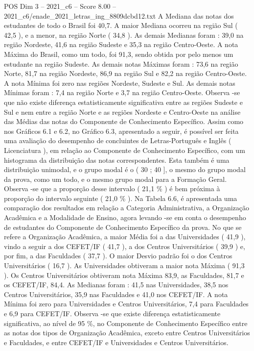 \begin{textsample}{POS Dim 3 – 2021\_c6 – Score 8.00 – 2021\_c6/enade\_2021\_letras\_ing\_8809dcbd12.txt}
A Mediana das notas dos estudantes de todo o Brasil foi 40,7.
A maior Mediana ocorreu na região Sul ( 42,5 ), e a menor, na região Norte ( 34,8 ).
As demais Medianas foram : 39,0 na região Nordeste, 41,6 na região Sudeste e 35,3 na região Centro-Oeste.
A nota Máxima do Brasil, como um todo, foi 91,3, sendo obtida por pelo menos um estudante na região Sudeste.
As demais notas Máximas foram : 73,6 na região Norte, 81,7 na região Nordeste, 86,9 na região Sul e 82,2 na região Centro-Oeste.
A nota Mínima foi zero nas regiões Nordeste, Sudeste e Sul.
As demais notas Mínimas foram : 7,4 na região Norte e 3,7 na região Centro-Oeste.
Observa -se que não existe diferença estatisticamente significativa entre as regiões Sudeste e Sul e nem entre a região Norte e as regiões Nordeste e Centro-Oeste na análise das Médias das notas do Componente de Conhecimento Específico.
Assim como nos Gráficos 6.1 e 6.2, no Gráfico 6.3, apresentado a seguir, é possível ser feita uma avaliação do desempenho de concluintes de Letras-Português e Inglês ( Licenciatura ), em relação ao Componente de Conhecimento Específico, com um histograma da distribuição das notas correspondentes.
Esta também é uma distribuição unimodal, e o grupo modal é o ( 30 ; 40 ], o mesmo do grupo modal da prova, como um todo, e o mesmo grupo modal para a Formação Geral.
Observa -se que a proporção desse intervalo ( 21,1 \% ) é bem próxima à proporção do intervalo seguinte ( 21,0 \% ).
Na Tabela 6.6, é apresentada uma comparação dos resultados em relação a Categoria Administrativa, a Organização Acadêmica e a Modalidade de Ensino, agora levando -se em conta o desempenho de estudantes do Componente de Conhecimento Específico da prova.
No que se refere a Organização Acadêmica, a maior Média foi a das Universidades ( 41,9 ), vindo a seguir a dos CEFET/IF ( 41,7 ), a dos Centros Universitários ( 39,9 ) e, por fim, a das Faculdades ( 37,7 ).
O maior Desvio padrão foi o dos Centros Universitários ( 16,7 ).
As Universidades obtiveram a maior nota Máxima ( 91,3 ).
Os Centros Universitários obtiveram nota Máxima 83,9, as Faculdades, 81,7 e os CEFET/IF, 84,4.
As Medianas foram : 41,5 nas Universidades, 38,5 nos Centros Universitários, 35,9 nas Faculdades e 41,0 nos CEFET/IF.
A nota Mínima foi zero para Universidades e Centros Universitários, 7,4 para Faculdades e 6,9 para CEFET/IF.
Observa -se que existe diferença estatisticamente significativa, ao nível de 95 \%, no Componente de Conhecimento Específico entre as notas dos tipos de Organização Acadêmica, exceto entre Centros Universitários e Faculdades, e entre CEFET/IF e Universidades e Centros Universitários.

\end{textsample}
